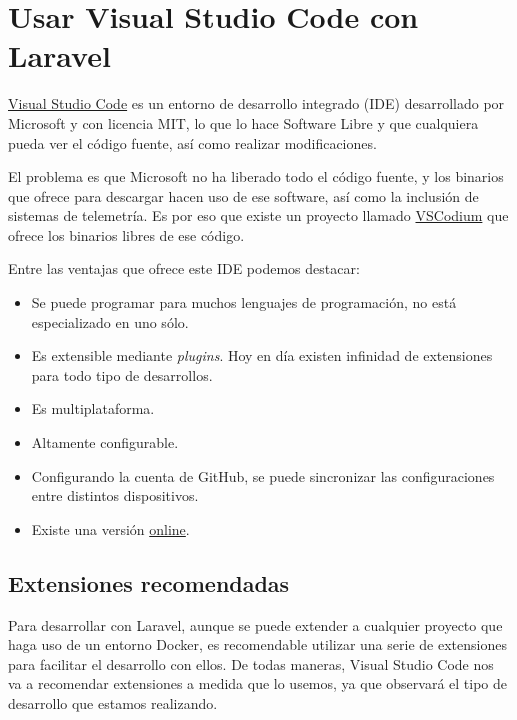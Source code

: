\chapter{Usar Visual Studio Code con Laravel}

\href{https://code.visualstudio.com/}{Visual Studio Code} es un entorno de desarrollo integrado (IDE) desarrollado por Microsoft y con licencia MIT, lo que lo hace Software Libre y que cualquiera pueda ver el código fuente, así como realizar modificaciones.

El problema es que Microsoft no ha liberado todo el código fuente, y los binarios que ofrece para descargar hacen uso de ese software, así como la inclusión de sistemas de telemetría. Es por eso que existe un proyecto llamado \href{https://vscodium.com/}{VSCodium} que ofrece los binarios libres de ese código.

Entre las ventajas que ofrece este IDE podemos destacar:

\begin{itemize}
    \item Se puede programar para muchos lenguajes de programación, no está especializado en uno sólo.

    \item Es extensible mediante \textit{plugins}. Hoy en día existen infinidad de extensiones para todo tipo de desarrollos.

    \item Es multiplataforma.

    \item Altamente configurable.

    \item Configurando la cuenta de GitHub, se puede sincronizar las configuraciones entre distintos dispositivos.

    \item Existe una versión \href{https://vscode.dev/}{online}.
\end{itemize}

\section{Extensiones recomendadas}

Para desarrollar con Laravel, aunque se puede extender a cualquier proyecto que haga uso de un entorno Docker, es recomendable utilizar una serie de extensiones para facilitar el desarrollo con ellos. De todas maneras, Visual Studio Code nos va a recomendar extensiones a medida que lo usemos, ya que observará el tipo de desarrollo que estamos realizando.

